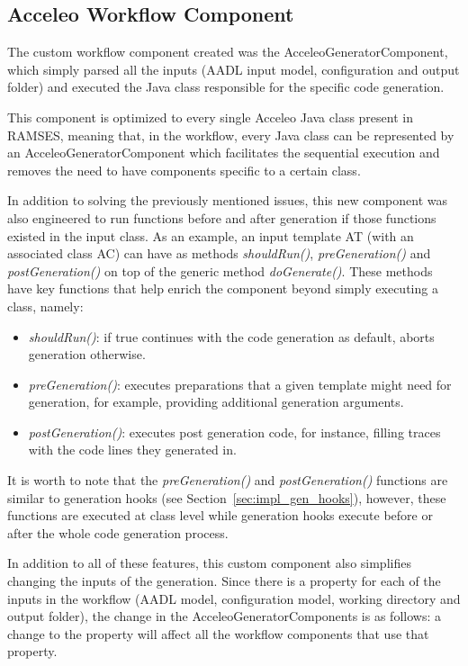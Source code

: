 \subsection{Acceleo Workflow Component}
\label{sec:workflows_acceleo}

The custom workflow component created was the AcceleoGeneratorComponent, which simply parsed all the inputs (AADL input model, configuration and output folder) and executed the Java class responsible for the specific code generation.

This component is optimized to every single Acceleo Java class present in \gls{RAMSES}, meaning that, in the workflow, every Java class can be represented by an AcceleoGeneratorComponent which facilitates the sequential execution and removes the need to have components specific to a certain class.

In addition to solving the previously mentioned issues, this new component was also engineered to run functions before and after generation if those functions existed in the input class. As an example, an input template AT (with an associated class AC) can have as methods \textit{shouldRun()}, \textit{preGeneration()} and \textit{postGeneration()} on top of the generic method \textit{doGenerate()}. These methods have key functions that help enrich the component beyond simply executing a class, namely:

\begin{itemize} 
	\item \textit{shouldRun()}: if true continues with the code generation as default, aborts generation otherwise.
	\item \textit{preGeneration()}: executes preparations that a given template might need for generation, for example, providing additional generation arguments.
	\item \textit{postGeneration()}: executes post generation code, for instance, filling traces with the code lines they generated in.
\end{itemize}

It is worth to note that the \textit{preGeneration()} and \textit{postGeneration()} functions are similar to generation hooks (see Section~\ref{sec:impl_gen_hooks}), however, these functions are executed at class level while generation hooks execute before or after the whole code generation process.

In addition to all of these features, this custom component also simplifies changing the inputs of the generation. Since there is a property for each of the inputs in the workflow (\gls{AADL} model, configuration model, working directory and output folder), the change in the AcceleoGeneratorComponents is as follows: a change to the property will affect all the workflow components that use that property.


